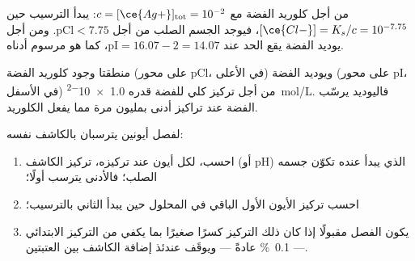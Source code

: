 من أجل كلوريد الفضة مع $c = [\ce{Ag+}]_{\mathrm{tot}} = 10^{-2}$:
يبدأ الترسيب حين $[\ce{Cl-}] = K_s/c = 10^{-7.75}$، فيوجد الجسم الصلب
من أجل $\mathrm{pCl} < 7.75$. ومن أجل يوديد الفضة يقع الحد عند
$\mathrm{pI} = 16.07 - 2 = 14.07$، كما هو مرسوم أدناه.

\begin{omfigure}

{\small منطقتا وجود كلوريد الفضة (على محور pCl، في الأعلى)
ويوديد الفضة (على محور pI، في الأسفل) من أجل تركيز كلي للفضة
قدره \qty{1.0e-2}{mol/L}. فاليوديد يرسّب الفضة عند تراكيز
أدنى بمليون مرة مما يفعل الكلوريد.}
\end{omfigure}

\begin{method}\label{met:b1:precipitation:selective}
لفصل أيونين يترسبان بالكاشف نفسه:
\begin{enumerate}
  \item احسب، لكل أيون عند تركيزه، تركيز الكاشف
        (أو pH) الذي يبدأ عنده تكوّن جسمه الصلب؛ فالأدنى
        يترسب أولًا؛
  \item احسب تركيز الأيون الأول الباقي في المحلول حين
        يبدأ الثاني بالترسيب؛
  \item يكون الفصل مقبولًا إذا كان ذلك التركيز كسرًا صغيرًا
        بما يكفي من التركيز الابتدائي --- \qty{0.1}{\percent} عادةً
        --- ويوقَف عندئذ إضافة الكاشف بين العتبتين.
\end{enumerate}
\end{method}

